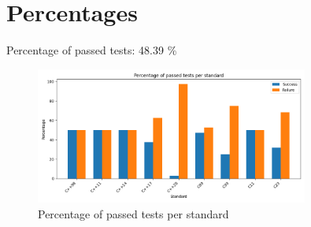 \documentclass{article}
\begin{document}
\section{Percentages}Percentage of passed tests:
48.39 \%\begin{figure}[h!]
\centering
\includegraphics[width=0.8\textwidth]{../reports/artisan/images/global_percentage.png}
\caption{Percentage of passed tests per standard}
\label{fig:global_percentage}
\end{figure}
\end{document}
